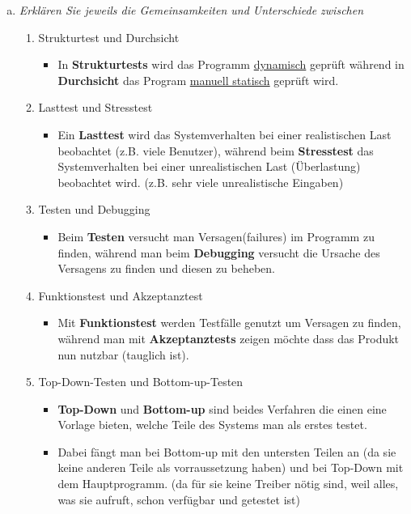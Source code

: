 \begin{enumerate}[(a)]
\item{\itshape Erklären Sie jeweils die Gemeinsamkeiten und Unterschiede zwischen}
    \begin{enumerate}[1.]
        \item Strukturtest und Durchsicht
        \begin{itemize}
            \item In \textbf{Strukturtests} wird das Programm \underline{dynamisch} geprüft während in \textbf{Durchsicht} das Program \underline{manuell statisch} geprüft wird.
        \end{itemize}
        
        \item Lasttest und Stresstest
        \begin{itemize}
            \item Ein \textbf{Lasttest} wird das Systemverhalten bei einer realistischen Last beobachtet (z.B. viele Benutzer), während beim \textbf{Stresstest} das Systemverhalten bei einer unrealistischen Last (Überlastung) beobachtet wird. (z.B. sehr viele unrealistische Eingaben)
        \end{itemize}
        
        \item Testen und Debugging
        \begin{itemize}
            \item Beim \textbf{Testen} versucht man Versagen(failures) im Programm zu finden, während man beim \textbf{Debugging} versucht die Ursache des Versagens zu finden und diesen zu beheben.
        \end{itemize}
        
        \item Funktionstest und Akzeptanztest
        \begin{itemize}
            \item Mit \textbf{Funktionstest} werden Testfälle genutzt um Versagen zu finden, während man mit \textbf{Akzeptanztests} zeigen möchte dass das Produkt nun nutzbar (tauglich ist).
        \end{itemize}
        
        \item Top-Down-Testen und Bottom-up-Testen
        \begin{itemize}
            \item \textbf{Top-Down} und \textbf{Bottom-up} sind beides Verfahren die einen eine Vorlage bieten, welche Teile des Systems man als erstes testet. 
            \item Dabei fängt man bei Bottom-up mit den untersten Teilen an (da sie keine anderen Teile als vorraussetzung haben) und bei Top-Down mit dem Hauptprogramm. (da für sie keine Treiber nötig sind, weil alles, was sie aufruft, schon verfügbar und getestet ist)
        \end{itemize}
    \end{enumerate}
    
\end{enumerate}


